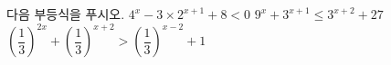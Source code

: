 다음 부등식을 푸시오.
 $4^{x}-3\times 2^{x+1}+8<0$
 $9^{x}+3^{x+1}\le 3^{x+2}+27$
 $\left(\dfrac{1}{3}\right)^{2x}+\left(\dfrac{1}{3}\right)^{x+2}>\left(\dfrac{1}{3}\right)^{x-2}+1$
